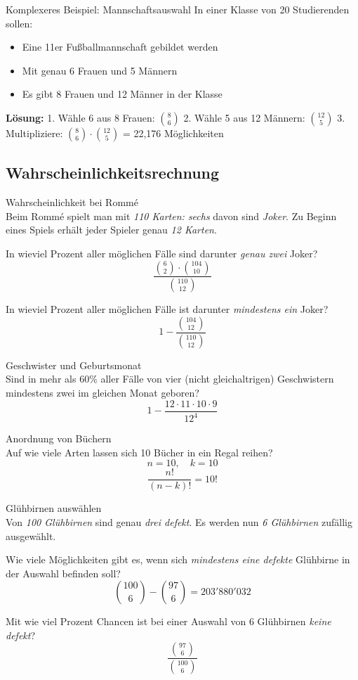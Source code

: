 \begin{example2}{Komplexeres Beispiel: Mannschaftsauswahl}
In einer Klasse von 20 Studierenden sollen:
\begin{itemize}
\item Eine 11er Fußballmannschaft gebildet werden
\item Mit genau 6 Frauen und 5 Männern
\item Es gibt 8 Frauen und 12 Männer in der Klasse
\end{itemize}

\textbf{Lösung:}
1. Wähle 6 aus 8 Frauen: $\binom{8}{6}$
2. Wähle 5 aus 12 Männern: $\binom{12}{5}$
3. Multipliziere: $\binom{8}{6} \cdot \binom{12}{5}$ = 22,176 Möglichkeiten
\end{example2}

\subsection{Wahrscheinlichkeitsrechnung}

\begin{example2}{Wahrscheinlichkeit bei Rommé}\\
Beim Rommé spielt man mit \emph{110 Karten: sechs} davon sind \emph{Joker}. Zu Beginn eines Spiels erhält jeder Spieler genau \emph{12 Karten}.

In wieviel Prozent aller möglichen Fälle sind darunter \emph{genau zwei} Joker?
$$\frac{\binom{6}{2} \cdot \binom{104}{10}}{\binom{110}{12}}$$

In wieviel Prozent aller möglichen Fälle ist darunter \emph{mindestens ein} Joker?
$$1 - \frac{\binom{104}{12}}{\binom{110}{12}}$$
\end{example2}

\begin{example2}{Geschwister und Geburtsmonat}\\
Sind in mehr als 60\% aller Fälle von vier (nicht gleichaltrigen) Geschwistern mindestens zwei im gleichen Monat geboren?
$$1 - \frac{12 \cdot 11 \cdot 10 \cdot 9}{12^4}$$
\end{example2}

\begin{example2}{Anordnung von Büchern}\\
Auf wie viele Arten lassen sich 10 Bücher in ein Regal reihen?
$$n = 10, \quad k = 10$$
$$\frac{n!}{(n-k)!} = 10!$$
\end{example2}

\begin{example2}{Glühbirnen auswählen}\\
Von \emph{100 Glühbirnen} sind genau \emph{drei defekt}. Es werden nun \emph{6 Glühbirnen} zufällig ausgewählt.

Wie viele Möglichkeiten gibt es, wenn sich \emph{mindestens eine defekte} Glühbirne in der Auswahl befinden soll?
$$\binom{100}{6} - \binom{97}{6} = 203'880'032$$

Mit wie viel Prozent Chancen ist bei einer Auswahl von 6 Glühbirnen \emph{keine defekt}?
$$\frac{\binom{97}{6}}{\binom{100}{6}}$$
\end{example2}

